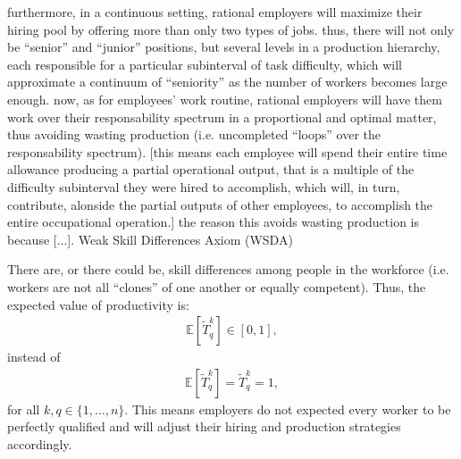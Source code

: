 \documentclass[hidelinks, nonatbib]{elsarticle}
\begin{document}
furthermore, in a continuous setting, rational employers will maximize their hiring pool by offering more than only two types of jobs. thus, there will not only be ``senior'' and ``junior'' positions, but several levels in a production hierarchy, each responsible for a particular subinterval of task difficulty, which will approximate a continuum of ``seniority'' as the number of workers becomes large enough.
now, as for employees' work routine, rational employers will have them work over their responsability spectrum in a proportional and optimal matter, thus avoiding wasting production (i.e. uncompleted ``loops'' over the responsability spectrum). [this means each employee will spend their entire time allowance producing a partial operational output, that is a multiple of the difficulty subinterval they were hired to accomplish, which will, in turn, contribute, alonside the partial outputs of other employees, to accomplish the entire occupational operation.]
the reason this avoids wasting production is because [...].
Weak Skill Differences Axiom (WSDA)

There are, or there could be, skill differences among people in the workforce (i.e. workers are not all ``clones'' of one another or equally competent). Thus, the expected value of productivity is:
\begin{gather}
    \mathbb{E}[
        \tilde{T}_{q}^{k}
    ]
    \in
    [0,1]
    ,
\end{gather}
instead of 
\begin{gather}
    \mathbb{E}[
        \tilde{T}_{q}^{k}
    ]
    =
    \tilde{T}_{q}^{k}
    = 1
    ,
\end{gather}
for all $k,q \in \{1, \dots, n\}$. This means employers do not expected every worker to be perfectly qualified and will adjust their hiring and production strategies accordingly.
\end{document}

